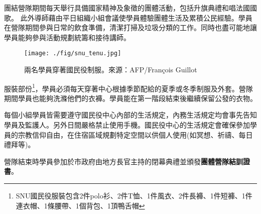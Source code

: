 \documentclass[a4paper,14pt]{extarticle}
\theoremstyle{plain}
\theoremstyle{remark}
\numberwithin{equation}{section}
\begin{document}
\par

團結營隊期間每天舉行具備國家精神及象徵的團體活動，包括升旗典禮和唱法國國歌。
此外導師藉由平日組織小組會議使學員體驗團體生活及累積公民經驗。學員在營隊期間參與日常的飲食準備，清潔打掃及垃圾分類的工作。同時也盡可能地讓學員能夠參與活動規劃統籌和接待講師。

\par 
\begin{wrapfigure}[]{r}{0.6\textwidth}
  \centering
	\texttt{[image: ./fig/snu\_tenu.jpg]}
\caption{兩名學員穿著國民役制服。來源：AFP/François Guillot}
\end{wrapfigure}
服裝部份\footnote{SNU國民役服裝包含2件polo衫、2件T恤、1件風衣、2件長褲、1件短褲、1件連衣帽、1條腰帶、1個背包、1頂鴨舌帽}，學員必須每天穿著中心根據季節配給的夏季或冬季制服及外套。營隊期間學員也能夠洗滌他們的衣褲。學員能在第一階段結束後繼續保留公發的衣物。



\par 每個小組學員皆需要遵守國民役中心內部的生活規定\cite{snu_officiel}，內務生活規定均會事先告知學員及監護人。另外日間嚴格禁止使用手機\cite{info-jeunes-snu}。國民役中心的生活規定會確保參加學員的宗教信仰自由，在住宿區域規劃特定空間以供個人使用(如冥想、祈禱、每日禮拜等)。

\par 
營隊結束時學員參加於市政府由地方長官主持的閉幕典禮並頒發\textbf{團體營隊結訓證書}。
\end{document}

